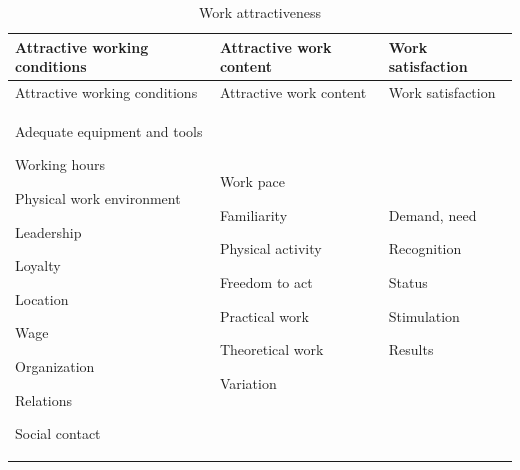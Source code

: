 \documentclass[
  12pt,
]{scrbook}
\begin{document}
\hypertarget{tbl:table41}{}
\begin{longtable}[]{@{}lll@{}}
\caption{\label{tbl:table41}Work attractiveness}\tabularnewline
\toprule
\begin{minipage}[b]{0.37\columnwidth}\raggedright
Attractive working conditions\strut
\end{minipage} & \begin{minipage}[b]{0.30\columnwidth}\raggedright
Attractive work content\strut
\end{minipage} & \begin{minipage}[b]{0.24\columnwidth}\raggedright
Work satisfaction\strut
\end{minipage}\tabularnewline
\midrule
\endfirsthead
\toprule
\begin{minipage}[b]{0.37\columnwidth}\raggedright
Attractive working conditions\strut
\end{minipage} & \begin{minipage}[b]{0.30\columnwidth}\raggedright
Attractive work content\strut
\end{minipage} & \begin{minipage}[b]{0.24\columnwidth}\raggedright
Work satisfaction\strut
\end{minipage}\tabularnewline
\midrule
\endhead
\begin{minipage}[t]{0.37\columnwidth}\raggedright
Adequate equipment and tools

Working hours

Physical work environment

Leadership

Loyalty

Location

Wage

Organization

Relations

Social contact\strut
\end{minipage} & \begin{minipage}[t]{0.30\columnwidth}\raggedright
Work pace

Familiarity

Physical activity

Freedom to act

Practical work

Theoretical work

Variation\strut
\end{minipage} & \begin{minipage}[t]{0.24\columnwidth}\raggedright
Demand, need

Recognition

Status

Stimulation

Results\strut
\end{minipage}\tabularnewline
\bottomrule
\end{longtable}
\end{document}
